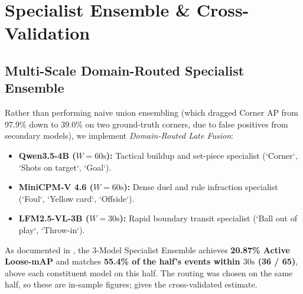 \documentclass[10pt,twocolumn,letterpaper]{article}
\begin{document}
\begin{table}[h]
\centering
\small
\caption{\textbf{RQ4 Audio Gating on Game~0 Half~1 (65 events; mAP over 17 classes; both ensemble gate rows use the same $+2.95\text{s}$-shifted input).}}
\label{tab:audio_grounding}
\end{table}

\section{Specialist Ensemble \& Cross-Validation}
\label{sec:rq5}

\subsection{Multi-Scale Domain-Routed Specialist Ensemble}
Rather than performing naive union ensembling (which dragged Corner AP from 97.9\% down to 39.0\% on two ground-truth corners, due to false positives from secondary models), we implement \textit{Domain-Routed Late Fusion}:
\begin{itemize}
    \item \textbf{Qwen3.5-4B ($W=60\text{s}$):} Tactical buildup and set-piece specialist (`Corner`, `Shots on target`, `Goal`).
    \item \textbf{MiniCPM-V 4.6 ($W=60\text{s}$):} Dense duel and rule infraction specialist (`Foul`, `Yellow card`, `Offside`).
    \item \textbf{LFM2.5-VL-3B ($W=30\text{s}$):} Rapid boundary transit specialist (`Ball out of play`, `Throw-in`).
\end{itemize}
As documented in , the 3-Model Specialist Ensemble achieves \textbf{20.87\% Active Loose-mAP} and matches \textbf{55.4\% of the half's events within $30\text{s}$ (36 / 65)}, above each constituent model on this half. The routing was chosen on the same half, so these are in-sample figures;  gives the cross-validated estimate.
\end{document}
